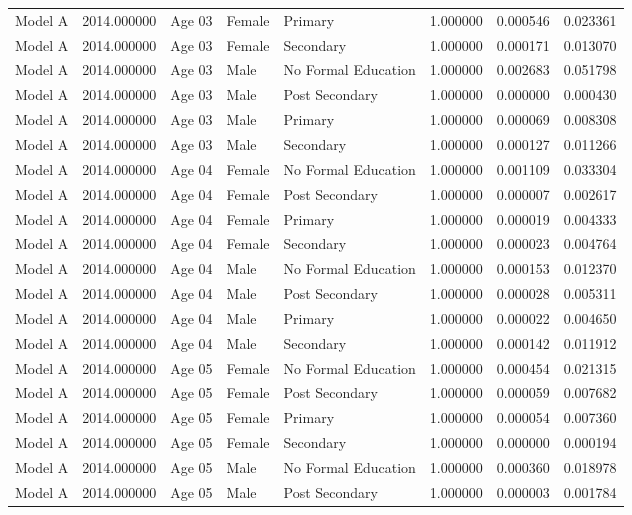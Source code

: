 \begin{table}[ht]
\begin{tabular}{lrlllrrr}
Model A & 2014.000000 & Age 03 & Female & Primary & 1.000000 & 0.000546 & 0.023361 \\
Model A & 2014.000000 & Age 03 & Female & Secondary & 1.000000 & 0.000171 & 0.013070 \\
Model A & 2014.000000 & Age 03 & Male & No Formal Education & 1.000000 & 0.002683 & 0.051798 \\
Model A & 2014.000000 & Age 03 & Male & Post Secondary & 1.000000 & 0.000000 & 0.000430 \\
Model A & 2014.000000 & Age 03 & Male & Primary & 1.000000 & 0.000069 & 0.008308 \\
Model A & 2014.000000 & Age 03 & Male & Secondary & 1.000000 & 0.000127 & 0.011266 \\
Model A & 2014.000000 & Age 04 & Female & No Formal Education & 1.000000 & 0.001109 & 0.033304 \\
Model A & 2014.000000 & Age 04 & Female & Post Secondary & 1.000000 & 0.000007 & 0.002617 \\
Model A & 2014.000000 & Age 04 & Female & Primary & 1.000000 & 0.000019 & 0.004333 \\
Model A & 2014.000000 & Age 04 & Female & Secondary & 1.000000 & 0.000023 & 0.004764 \\
Model A & 2014.000000 & Age 04 & Male & No Formal Education & 1.000000 & 0.000153 & 0.012370 \\
Model A & 2014.000000 & Age 04 & Male & Post Secondary & 1.000000 & 0.000028 & 0.005311 \\
Model A & 2014.000000 & Age 04 & Male & Primary & 1.000000 & 0.000022 & 0.004650 \\
Model A & 2014.000000 & Age 04 & Male & Secondary & 1.000000 & 0.000142 & 0.011912 \\
Model A & 2014.000000 & Age 05 & Female & No Formal Education & 1.000000 & 0.000454 & 0.021315 \\
Model A & 2014.000000 & Age 05 & Female & Post Secondary & 1.000000 & 0.000059 & 0.007682 \\
Model A & 2014.000000 & Age 05 & Female & Primary & 1.000000 & 0.000054 & 0.007360 \\
Model A & 2014.000000 & Age 05 & Female & Secondary & 1.000000 & 0.000000 & 0.000194 \\
Model A & 2014.000000 & Age 05 & Male & No Formal Education & 1.000000 & 0.000360 & 0.018978 \\
Model A & 2014.000000 & Age 05 & Male & Post Secondary & 1.000000 & 0.000003 & 0.001784 \\

\end{tabular}
\end{table}
